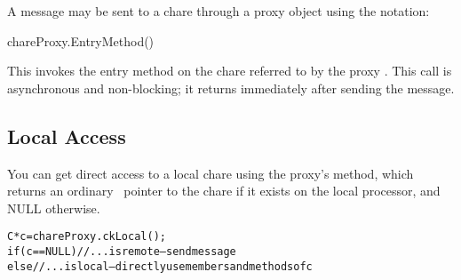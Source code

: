 A message  may be sent to a chare through a proxy
object using the notation:

\begin{tabbing}
chareProxy.EntryMethod()
\end{tabbing}

This invokes the entry method  on the chare referred
to by the proxy . This call
is asynchronous and non-blocking; it returns immediately after sending the
message. 


\subsection{Local Access}

You can get direct access to a local chare using the
proxy's  method, which returns an ordinary \CC\ pointer
to the chare if it exists on the local processor, and NULL otherwise.

\begin{alltt}
C *c=chareProxy.ckLocal();
if (c==NULL) //...is remote-- send message
else //...is local-- directly use members and methods of c
\end{alltt}

